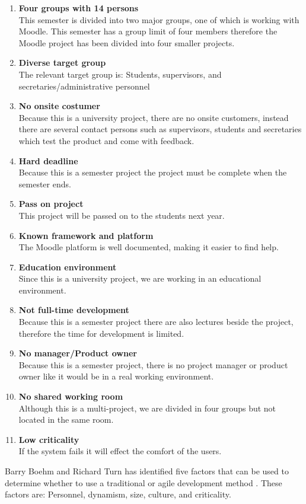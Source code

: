 \begin{enumerate}
	\item \textbf{Four groups with 14 persons} \label{enum:groupSize}\\
	This semester is divided into two major groups, one of which is working with Moodle. This semester has a group limit of four members therefore the Moodle project has been divided into four smaller projects.
	\item \textbf{Diverse target group}\\ 
	The relevant target group is: Students, supervisors, and secretaries/administrative personnel \label{enum:targetGroup}\\
	\item \textbf{No onsite costumer} \label{enum:onsite}\\
	Because this is a university project, there are no onsite customers, instead there are several contact persons such as supervisors, students and secretaries which test the product and come with feedback.
	\item \textbf{Hard deadline} \label{enum:deadline}\\
	Because this is a semester project the project must be complete when the semester ends.
	\item \textbf{Pass on project} \label{enum:passed}\\
	This project will be passed on to the students next year.
	\item \textbf{Known framework and platform} \label{enum:framework}\\
	The Moodle platform is well documented, making it easier to find help.
	\item \textbf{Education environment} \label{enum:education}\\
	Since this is a university project, we are working in an educational environment.
	\item \textbf{Not full-time development} \label{enum:halftime}\\
	Because this is a semester project there are also lectures beside the project, therefore the time for development is limited. 
	\item \textbf{No manager/Product owner} \label{enum:manager}\\
	Because this is a semester project, there is no project manager or product owner like it would be in a real working environment.
	\item \textbf{No shared working room} \label{enum:room}\\
	Although this is a multi-project, we are divided in four groups but not located in the same room.
	\item \textbf{Low criticality} \label{enum:criticality}\\
	If the system fails it will effect the comfort of the users.
\end{enumerate}
Barry Boehm and Richard Turn has identified five factors that can be used to determine whether to use a traditional or agile development method \citep{boehmTurner}.
These factors are: Personnel, dynamism, size, culture, and criticality.

